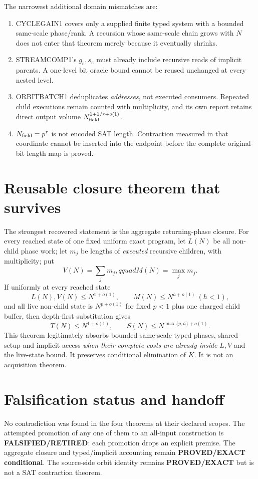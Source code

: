 \documentclass[11pt]{article}
\begin{document}
The narrowest additional domain mismatches are:
\begin{enumerate}
\item CYCLEGAIN1 covers only a supplied finite typed system with a bounded
same-scale phase/rank.  A recursion whose same-scale chain grows with $N$
does not enter that theorem merely because it eventually shrinks.
\item STREAMCOMP1's $g_e,s_e$ must already include recursive reads of implicit
parents.  A one-level bit oracle bound cannot be reused unchanged at every
nested level.
\item ORBITBATCH1 deduplicates \emph{addresses}, not executed consumers.
Repeated child executions remain counted with multiplicity, and its own
report retains direct output volume $N_{\rm field}^{1+1/r+o(1)}$.
\item $N_{\rm field}=p^r$ is not encoded SAT length.  Contraction measured in
that coordinate cannot be inserted into the endpoint before the complete
original-bit length map is proved.
\end{enumerate}

\section*{Reusable closure theorem that survives}
The strongest recovered statement is the aggregate returning-phase closure.
For every reached state of one fixed uniform exact program, let $L(N)$ be all
non-child phase work; let $m_j$ be lengths of \emph{executed} recursive
children, with multiplicity; put
\[
 V(N)=\sum_jm_j,qquad M(N)=\max_jm_j.
\]
If uniformly at every reached state
\[
 L(N),V(N)\le N^{1+o(1)},\qquad M(N)\le N^{h+o(1)}\ (h<1),
\]
and all live non-child state is $N^{p+o(1)}$ for fixed $p<1$ plus one charged
child buffer, then depth-first substitution gives
\[
 T(N)\le N^{1+o(1)},\qquad
 S(N)\le N^{\max\{p,h\}+o(1)}.
\]
This theorem legitimately absorbs bounded same-scale typed phases, shared
setup and implicit access \emph{when their complete costs are already inside}
$L,V$ and the live-state bound.  It preserves conditional elimination of
$K$.  It is not an acquisition theorem.

\section*{Falsification status and handoff}
No contradiction was found in the four theorems at their declared scopes.
The attempted promotion of any one of them to an all-input construction is
\textbf{FALSIFIED/RETIRED}: each promotion drops an explicit premise.  The
aggregate closure and typed/implicit accounting remain \textbf{PROVED/EXACT
conditional}.  The source-side orbit identity remains \textbf{PROVED/EXACT}
but is not a SAT contraction theorem.
\end{document}
